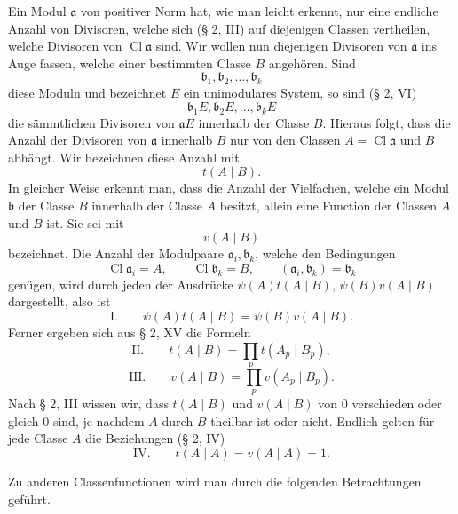 \documentclass[11pt,a4paper]{article}
\newcommand{\Cl}{\operatorname{Cl}}
\begin{document}
Ein Modul $\mathfrak a$ von positiver Norm hat, wie man leicht erkennt, nur eine endliche Anzahl von Divisoren, welche sich (§ 2, III) auf diejenigen Classen vertheilen, welche Divisoren von $\Cl\mathfrak a$ sind. Wir wollen nun diejenigen Divisoren von $\mathfrak a$ ins Auge fassen, welche einer bestimmten Classe $B$ angehören. Sind
\[
 \mathfrak b_1,\mathfrak b_2,\ldots,\mathfrak b_k
\]
diese Moduln und bezeichnet $E$ ein unimodulares System, so sind (§ 2, VI)
\[
 \mathfrak b_1E,\mathfrak b_2E,\ldots,\mathfrak b_kE
\]
die sämmtlichen Divisoren von $\mathfrak aE$ innerhalb der Classe $B$. Hieraus folgt, dass die Anzahl der Divisoren von $\mathfrak a$ innerhalb $B$ nur von den Classen $A=\Cl\mathfrak a$ und $B$ abhängt. Wir bezeichnen diese Anzahl mit
\[
 t(A\mid B).
\]
In gleicher Weise erkennt man, dass die Anzahl der Vielfachen, welche ein Modul $\mathfrak b$ der Classe $B$ innerhalb der Classe $A$ besitzt, allein eine Function der Classen $A$ und $B$ ist. Sie sei mit
\[
 v(A\mid B)
\]
bezeichnet. Die Anzahl der Modulpaare $\mathfrak a_i,\mathfrak b_k$, welche den Bedingungen
\[
 \Cl\mathfrak a_i=A,
 \qquad
 \Cl\mathfrak b_k=B,
 \qquad
 (\mathfrak a_i,\mathfrak b_k)=\mathfrak b_k
\]
genügen, wird durch jeden der Ausdrücke $\psi(A)t(A\mid B)$, $\psi(B)v(A\mid B)$ dargestellt, also ist
\[
\text{I.}\qquad
 \psi(A)t(A\mid B)=\psi(B)v(A\mid B).
\]
Ferner ergeben sich aus § 2, XV die Formeln
\[
\text{II.}\qquad t(A\mid B)=\prod_p t(A_p\mid B_p),
\]
\[
\text{III.}\qquad v(A\mid B)=\prod_p v(A_p\mid B_p).
\]
Nach § 2, III wissen wir, dass $t(A\mid B)$ und $v(A\mid B)$ von 0 verschieden oder gleich 0 sind, je nachdem $A$ durch $B$ theilbar ist oder nicht. Endlich gelten für jede Classe $A$ die Beziehungen (§ 2, IV)
\[
\text{IV.}\qquad t(A\mid A)=v(A\mid A)=1.
\]

Zu anderen Classenfunctionen wird man durch die folgenden Betrachtungen geführt.
\end{document}
